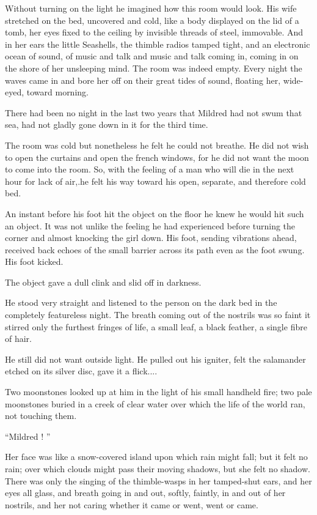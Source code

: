 \documentclass[11pt,openany]{book}
\begin{document}
Without turning on the light he imagined how this room would look. His wife stretched on the bed, uncovered and cold, like a body displayed on the lid of a tomb, her eyes fixed to the ceiling by invisible threads of steel, immovable. And in her ears the little Seashells, the thimble radios tamped tight, and an electronic ocean of sound, of music and talk and music and talk coming in, coming in on the shore of her unsleeping mind. The room was indeed empty. Every night the waves came in and bore her off on their great tides of sound, floating her, wide-eyed, toward morning.

There had been no night in the last two years that Mildred had not swum that sea, had not gladly gone down in it for the third time.

The room was cold but nonetheless he felt he could not breathe. He did not wish to open the curtains and open the french windows, for he did not want the moon to come into the room. So, with the feeling of a man who will die in the next hour for lack of air,.he felt his way toward his open, separate, and therefore cold bed.

An instant before his foot hit the object on the floor he knew he would hit such an object. It was not unlike the feeling he had experienced before turning the corner and almost knocking the girl down. His foot, sending vibrations ahead, received back echoes of the small barrier across its path even as the foot swung. His foot kicked.

The object gave a dull clink and slid off in darkness.

He stood very straight and listened to the person on the dark bed in the completely featureless night. The breath coming out of the nostrils was so faint it stirred only the furthest fringes of life, a small leaf, a black feather, a single fibre of hair.

He still did not want outside light. He pulled out his igniter, felt the salamander etched on its silver disc, gave it a flick....

Two moonstones looked up at him in the light of his small handheld fire; two pale moonstones buried in a creek of clear water over which the life of the world ran, not touching them.

``Mildred ! ''

Her face was like a snow-covered island upon which rain might fall; but it felt no rain; over which clouds might pass their moving shadows, but she felt no shadow. There was only the singing of the thimble-wasps in her tamped-shut ears, and her eyes all glass, and breath going in and out, softly, faintly, in and out of her nostrils, and her not caring whether it came or went, went or came.
\end{document}

